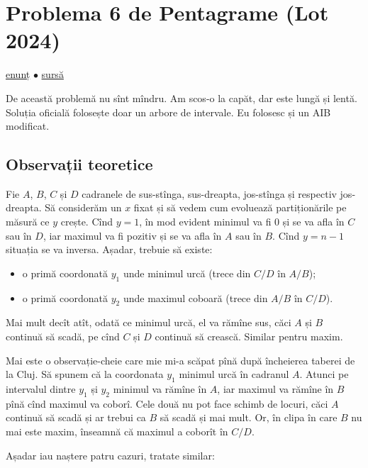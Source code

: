 \documentclass[../main.tex]{subfiles}
\begin{document}
\section{Problema 6 de Pentagrame (Lot 2024)}
\label{problem:6-de-pentagrame}

\href{https://kilonova.ro/problems/2801}{enunț}
$\bullet$
\hyperref[code:6-de-pentagrame]{sursă}

De această problemă nu sînt mîndru. Am scos-o la capăt, dar este lungă și lentă. Soluția oficială folosește doar un arbore de intervale. Eu folosesc și un AIB modificat.

\subsection{Observații teoretice}

Fie $A$, $B$, $C$ și $D$ cadranele de sus-stînga, sus-dreapta, jos-stînga și respectiv jos-dreapta. Să considerăm un $x$ fixat și să vedem cum evoluează partiționările pe măsură ce $y$ crește. Cînd $y = 1$, în mod evident minimul va fi 0 și se va afla în $C$ sau în $D$, iar maximul va fi pozitiv și se va afla în $A$ sau în $B$. Cînd $y = n - 1$ situația se va inversa. Așadar, trebuie să existe:

\begin{itemize}
  \item o primă coordonată $y_1$ unde minimul urcă (trece din $C/D$ în $A/B$);
  \item o primă coordonată $y_2$ unde maximul coboară (trece din $A/B$ în $C/D$).
\end{itemize}

Mai mult decît atît, odată ce minimul urcă, el va rămîne sus, căci $A$ și $B$ continuă să scadă, pe cînd $C$ și $D$ continuă să crească. Similar pentru maxim.

Mai este o observație-cheie care mie mi-a scăpat pînă după încheierea taberei de la Cluj.  Să spunem că la coordonata $y_1$ minimul urcă în cadranul $A$. Atunci pe intervalul dintre $y_1$ și $y_2$ minimul va rămîne în $A$, iar maximul va rămîne în $B$ pînă cînd maximul va coborî. Cele două nu pot face schimb de locuri, căci $A$ continuă să scadă și ar trebui ca $B$ să scadă și mai mult. Or, în clipa în care $B$ nu mai este maxim, înseamnă că maximul a coborît în $C/D$.

Așadar iau naștere patru cazuri, tratate similar:
\end{document}
